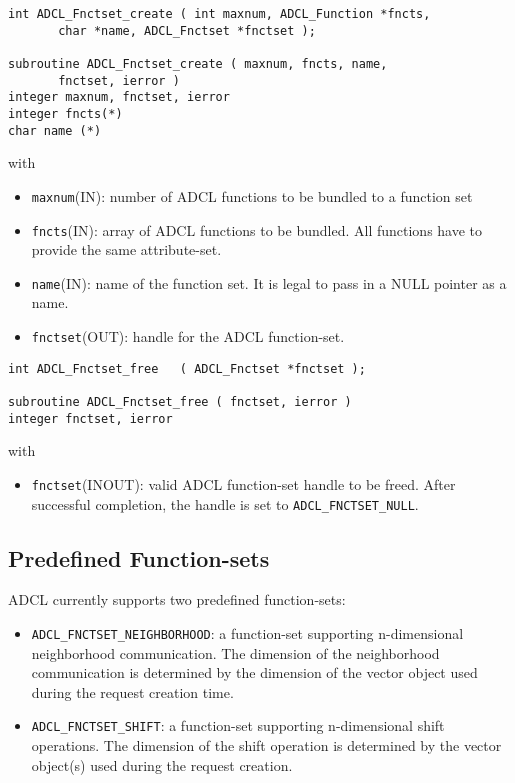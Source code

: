 \hspace{1cm}
\begin{verbatim}
int ADCL_Fnctset_create ( int maxnum, ADCL_Function *fncts, 
       char *name, ADCL_Fnctset *fnctset );

subroutine ADCL_Fnctset_create ( maxnum, fncts, name, 
       fnctset, ierror )
integer maxnum, fnctset, ierror
integer fncts(*)
char name (*)
\end{verbatim}
with
\begin{itemize}
\item {\tt maxnum}(IN): number of ADCL functions to be bundled to a function set
\item {\tt fncts}(IN): array of ADCL functions to be bundled. All functions have to provide
	  the same attribute-set.
\item {\tt name}(IN): name of the function set. It is legal to pass in a NULL pointer as a name.
\item {\tt fnctset}(OUT): handle for the ADCL function-set.
\end{itemize}

\hspace{1cm}
\begin{verbatim}
int ADCL_Fnctset_free   ( ADCL_Fnctset *fnctset );

subroutine ADCL_Fnctset_free ( fnctset, ierror )
integer fnctset, ierror
\end{verbatim}
with
\begin{itemize}
\item {\tt fnctset}(INOUT): valid ADCL function-set handle to be freed. After successful completion, the handle is set to {\tt ADCL\_FNCTSET\_NULL}.
\end{itemize}


\pagebreak
\subsection{Predefined Function-sets}
\label{fnctset-predef}

ADCL currently supports two predefined function-sets: 
\begin{itemize}
\item {\tt ADCL\_FNCTSET\_NEIGHBORHOOD}: a function-set supporting n-dimensional neighborhood communication. The dimension
	of the neighborhood communication is determined by the dimension of the vector object used during the request creation time.
\item {\tt ADCL\_FNCTSET\_SHIFT}: a function-set supporting n-dimensional shift operations. The dimension of the shift operation is determined by the vector object(s) used during the request creation.
\end{itemize}

